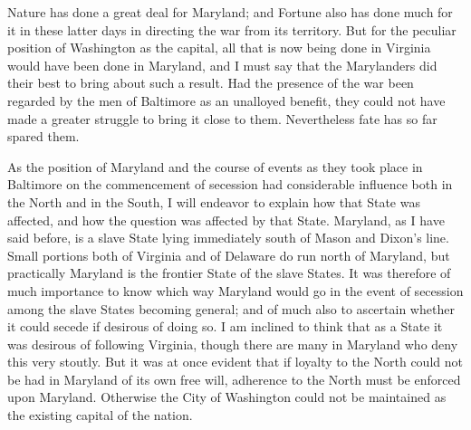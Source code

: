 Nature has done a great deal for Maryland; and Fortune also has
done much for it in these latter days in directing the war from its
territory.  But for the peculiar position of Washington as the
capital, all that is now being done in Virginia would have been
done in Maryland, and I must say that the Marylanders did their
best to bring about such a result.  Had the presence of the war
been regarded by the men of Baltimore as an unalloyed benefit, they
could not have made a greater struggle to bring it close to them.
Nevertheless fate has so far spared them.

As the position of Maryland and the course of events as they took
place in Baltimore on the commencement of secession had
considerable influence both in the North and in the South, I will
endeavor to explain how that State was affected, and how the
question was affected by that State.  Maryland, as I have said
before, is a slave State lying immediately south of Mason and
Dixon's line.  Small portions both of Virginia and of Delaware do
run north of Maryland, but practically Maryland is the frontier
State of the slave States.  It was therefore of much importance to
know which way Maryland would go in the event of secession among
the slave States becoming general; and of much also to ascertain
whether it could secede if desirous of doing so.  I am inclined to
think that as a State it was desirous of following Virginia, though
there are many in Maryland who deny this very stoutly.  But it was
at once evident that if loyalty to the North could not be had in
Maryland of its own free will, adherence to the North must be
enforced upon Maryland.  Otherwise the City of Washington could not
be maintained as the existing capital of the nation.

